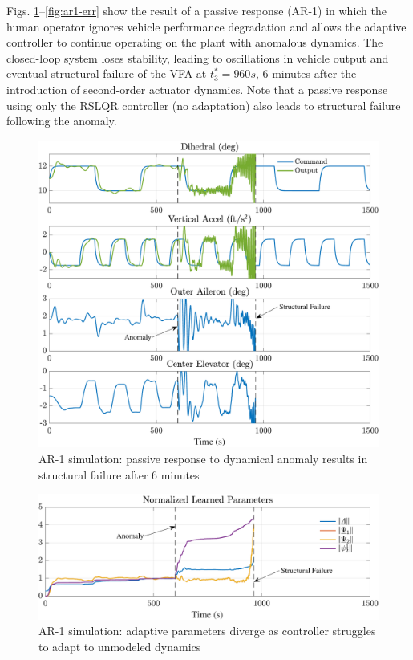 \documentclass[english]{ifacconf}
\begin{document}
Figs. \ref{fig:ar1}--\ref{fig:ar1-err} show the result of a passive response (AR-1) in which the human operator ignores vehicle performance degradation and allows the adaptive controller to continue operating on the plant with anomalous dynamics. The closed-loop system loses stability, leading to oscillations in vehicle output and eventual structural failure of the VFA at $t_3^* = 960 s$, 6 minutes after the introduction of second-order actuator dynamics. Note that a passive response using only the RSLQR controller (no adaptation) also leads to structural failure following the anomaly.

\begin{figure}[htbp]
	\centering
	\includegraphics[width=\columnwidth]{../fig/ar1.pdf}
	\caption{AR-1 simulation: passive response to dynamical anomaly results in structural failure after 6 minutes}
	\label{fig:ar1}
\end{figure}

\begin{figure}[htbp]
	\centering
	\includegraphics[width=\columnwidth]{../fig/ar1-params.pdf}
	\caption{AR-1 simulation: adaptive parameters diverge as controller struggles to adapt to unmodeled dynamics}
	\label{fig:ar1-params}
\end{figure}
\end{document}
